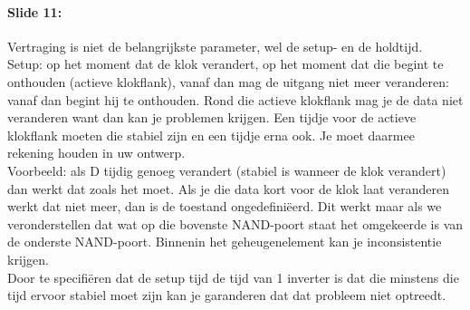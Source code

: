 \documentclass[10pt,a4paper]{book}
\begin{document}
\paragraph{Slide 11:} Vertraging is niet de belangrijkste parameter, wel de setup- en de holdtijd.\\
Setup: op het moment dat de klok verandert, op het moment dat die begint te onthouden (actieve klokflank), vanaf dan mag de uitgang niet meer veranderen: vanaf dan begint hij te onthouden. Rond die actieve klokflank mag je de data niet veranderen want dan kan je problemen krijgen. Een tijdje voor de actieve klokflank moeten die stabiel zijn en een tijdje erna ook. Je moet daarmee rekening houden in uw ontwerp.\\
Voorbeeld: als D tijdig genoeg verandert (stabiel is wanneer de klok verandert) dan werkt dat zoals het moet. Als je die data kort voor de klok laat veranderen werkt dat niet meer, dan is de toestand ongedefini\"eerd. Dit werkt maar als we veronderstellen dat wat op die bovenste NAND-poort staat het omgekeerde is van de onderste NAND-poort.  Binnenin het geheugenelement kan je inconsistentie krijgen.\\
Door te specifi\"eren dat de setup tijd de tijd van 1 inverter is dat die minstens die tijd ervoor stabiel moet zijn kan je garanderen dat dat probleem niet optreedt.
\end{document}
